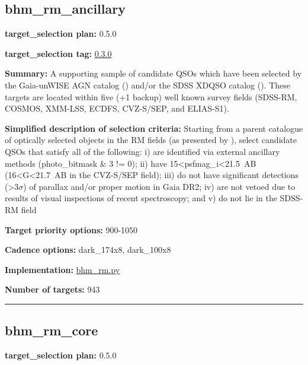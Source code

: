 \hypertarget{bhm_rm_ancillary_plan0.5.0}{%
\subsection{bhm\_rm\_ancillary}\label{bhm_rm_ancillary_plan0.5.0}}

\noindent\textbf{target\_selection plan:} 0.5.0

\noindent\textbf{target\_selection tag:}
\href{https://github.com/sdss/target_selection/tree/0.3.0/}{0.3.0}

\noindent\textbf{Summary:} A supporting sample of candidate QSOs which have been
selected by the Gaia-unWISE AGN catalog
(\citealt{Shu2019}) and/or the SDSS XDQSO catalog
(\citealt{Bovy2011}). These targets are located within five (+1 backup) well
known survey fields (SDSS-RM, COSMOS, XMM-LSS, ECDFS, CVZ-S/SEP, and
ELIAS-S1).

\noindent\textbf{Simplified description of selection criteria:} Starting from a
parent catalogue of optically selected objects in the RM fields (as
presented by
\citealt{Yang2022}), select candidate QSOs that satisfy all of the
following: i) are identified via external ancillary methods
(photo\_bitmask \& 3 != 0); ii) have
15\textless psfmag\_i\textless21.5~AB (16\textless G\textless21.7~AB in
the CVZ-S/SEP field); iii) do not have significant detections
(\textgreater3$\sigma$) of parallax and/or proper motion in Gaia DR2; iv) are
not vetoed due to results of visual inspections of recent spectroscopy;
and v) do not lie in the SDSS-RM field


\noindent\textbf{Target priority options:} 900-1050

\noindent\textbf{Cadence options:} dark\_174x8, dark\_100x8

\noindent\textbf{Implementation:}
\href{https://github.com/sdss/target_selection/blob/0.3.0/python/target_selection/cartons/bhm_rm.py}{bhm\_rm.py}

\noindent\textbf{Number of targets:} 943

\begin{center}\rule{0.5\linewidth}{0.5pt}\end{center}

\hypertarget{bhm_rm_core_plan0.5.0}{%
\subsection{bhm\_rm\_core}\label{bhm_rm_core_plan0.5.0}}

\noindent\textbf{target\_selection plan:} 0.5.0

